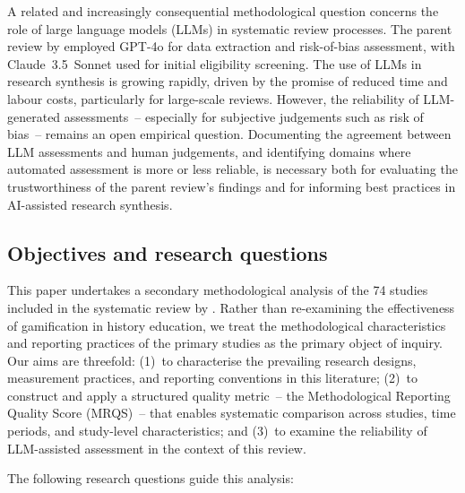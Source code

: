 \documentclass[etq]{acnsart}
\begin{document}
	A related and increasingly consequential methodological question concerns the role of large language models (LLMs) in systematic review processes. The parent review by \citet{KorniienkoSemerikov2024} employed GPT-4o for data extraction and risk-of-bias assessment, with Claude~3.5~Sonnet used for initial eligibility screening. The use of LLMs in research synthesis is growing rapidly, driven by the promise of reduced time and labour costs, particularly for large-scale reviews. However, the reliability of LLM-generated assessments~-- especially for subjective judgements such as risk of bias~-- remains an open empirical question. Documenting the agreement between LLM assessments and human judgements, and identifying domains where automated assessment is more or less reliable, is necessary both for evaluating the trustworthiness of the parent review's findings and for informing best practices in AI-assisted research synthesis.
	
	\subsection{Objectives and research questions}
	\label{sec:intro_objectives}
	
	This paper undertakes a secondary methodological analysis of the 74 studies included in the systematic review by \citet{KorniienkoSemerikov2024}. Rather than re-examining the effectiveness of gamification in history education, we treat the methodological characteristics and reporting practices of the primary studies as the primary object of inquiry. Our aims are threefold: (1)~to characterise the prevailing research designs, measurement practices, and reporting conventions in this literature; (2)~to construct and apply a structured quality metric~-- the Methodological Reporting Quality Score (MRQS)~-- that enables systematic comparison across studies, time periods, and study-level characteristics; and (3)~to examine the reliability of LLM-assisted assessment in the context of this review.
	
	The following research questions guide this analysis:
	
\end{document}
